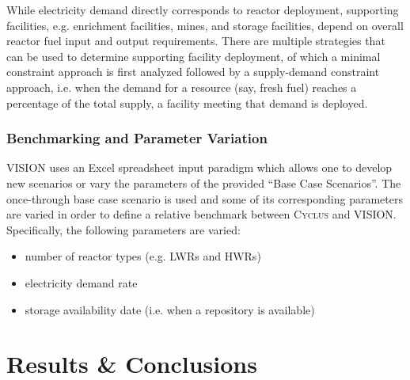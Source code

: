 \documentclass{anstrans}
\begin{document}
While electricity demand directly corresponds to reactor deployment,
supporting facilities, e.g. enrichment facilities, mines, and storage
facilities, depend on overall reactor fuel input and output
requirements. There are multiple strategies that can be used to
determine supporting facility deployment, of which a minimal
constraint approach is first analyzed followed by a supply-demand
constraint approach, i.e. when the demand for a resource (say, fresh
fuel) reaches a percentage of the total supply, a facility meeting
that demand is deployed.

\subsubsection{Benchmarking and Parameter Variation}
VISION uses an Excel spreadsheet input paradigm which allows one to
develop new scenarios or vary the parameters of the provided ``Base
Case Scenarios''. The once-through base case scenario is used and some
of its corresponding parameters are varied in order to define a
relative benchmark between \textsc{Cyclus} and VISION. Specifically, the
following parameters are varied:
\begin{itemize}
\item number of reactor types (e.g. LWRs and HWRs)
\item electricity demand rate
\item storage availability date (i.e. when a repository is available)
\end{itemize}

\section{Results \& Conclusions}

\end{document}
